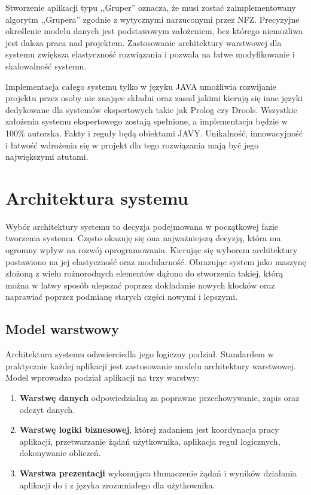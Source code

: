 Stworzenie aplikacji typu ,,Gruper'' oznacza, że musi zostać zaimplementowany algorytm ,,Grupera'' zgodnie z wytycznymi narzuconymi przez NFZ. Precyzyjne określenie modelu danych jest podstawowym założeniem, bez którego niemożliwa jest dalsza praca nad projektem. Zastosowanie architektury warstwowej dla systemu zwiększa elastyczność rozwiązania i pozwala na łatwe modyfikowanie i skalowalność systemu.

Implementacja całego systemu tylko w języku JAVA umożliwia rozwijanie projektu przez osoby nie znające składni oraz zasad jakimi kierują się inne języki dedykowane dla systemów ekspertowych takie jak Prolog czy Drools. Wszystkie założenia systemu ekspertowego zostają spełnione, a implementacja będzie w 100\% autorska. Fakty i reguły będą obiektami JAVY. Unikalność, innowacyjność i łatwość wdrożenia się w projekt dla tego rozwiązania mają być jego największymi atutami.



\section{Architektura systemu}
\label{sec:architekturaSystemu}

Wybór architektury systemu to decyzja podejmowana w początkowej fazie tworzenia systemu. Często okazuję się ona najważniejszą decyzją, która ma ogromny wpływ na rozwój oprogramowania\cite{sienkiewicz_architektura}. Kierując się wyborem architektury postawiono na jej elastyczność oraz modularność. Obrazując system jako maszynę złożoną z wielu rożnorodnych elementów dążono do stworzenia takiej, którą można w łatwy sposób ulepszać poprzez dokładanie nowych klocków oraz naprawiać poprzez podmianę starych części nowymi i lepszymi.

\subsection{Model warstwowy}
\label{sec:model3warstwowy}
Architektura systemu odzwierciedla jego logiczny podział. Standardem w praktycznie każdej aplikacji jest zastosowanie modelu architektury warstwowej\cite{sienkiewicz_architektura}. Model wprowadza podział aplikacji na trzy warstwy:
\begin{enumerate}
 \item \textbf{Warstwę danych} odpowiedzialną za poprawne przechowywanie, zapis oraz odczyt danych.
 \item \textbf{Warstwę logiki biznesowej}, której zadaniem jest koordynacja pracy aplikacji, przetwarzanie żądań użytkownika, aplikacja reguł logicznych, dokonywanie obliczeń.
 \item \textbf{Warstwa prezentacji} wykonująca tłumaczenie żądań i wyników działania aplikacji do i z języka zrozumiałego dla użytkownika.
\end{enumerate}

